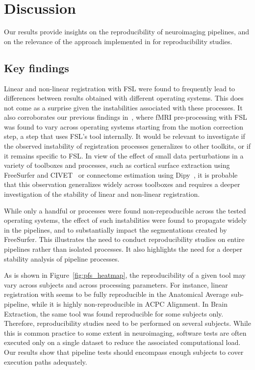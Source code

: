 \section{Discussion}

Our results provide insights on the reproducibility of
neuroimaging pipelines, and on the relevance of the approach implemented
in \toolname for reproducibility studies.

\subsection{Key findings}
Linear and non-linear registration with FSL were found to
frequently lead to differences between results obtained with different
operating systems. This does not come as a surprise given the instabilities
associated with these processes. It also corroborates our previous findings
in~\cite{Glatard2015}, where fMRI pre-processing with FSL was found to vary across operating systems
starting from the motion
correction step, a step that uses FSL's \flirt tool internally. It
would be relevant to investigate if the observed instability of
registration processes generalizes to other toolkits, or if it remains specific
to FSL. In view of the effect of small data perturbations in a variety of
toolboxes and processes, such as cortical surface extraction using
FreeSurfer and CIVET~\cite{Lindsay2017hbm} or connectome estimation using
Dipy~\cite{kiar2020comparing}, it is probable that this observation
generalizes widely across toolboxes and requires a deeper investigation of
the stability of linear and non-linear registration.

While only a handful or processes were found non-reproducible across the
tested operating systems, the effect of such instabilities were found to
propagate widely in the pipelines, and to substantially impact the segmentations
created by FreeSurfer. This illustrates the need to conduct reproducibility studies
on entire pipelines rather than isolated processes. It also highlights the need
for a deeper stability analysis of pipeline processes.

As is shown in Figure~\ref{fig:pfs_heatmap}, the reproducibility of
a given tool may vary across subjects and across processing parameters. For
instance, linear registration with \flirt seems to be fully reproducible in
the Anatomical Average sub-pipeline, while it is highly non-reproducible in
ACPC Alignment. In Brain Extraction, the same tool was found reproducible
for some subjects only. Therefore, reproducibility studies need to be
performed on several subjects. While this is common practice to some extent in neuroimaging,
software tests are often executed only on a single dataset to reduce the
associated computational load. Our results show that pipeline tests should
encompass enough subjects to cover execution paths adequately.

